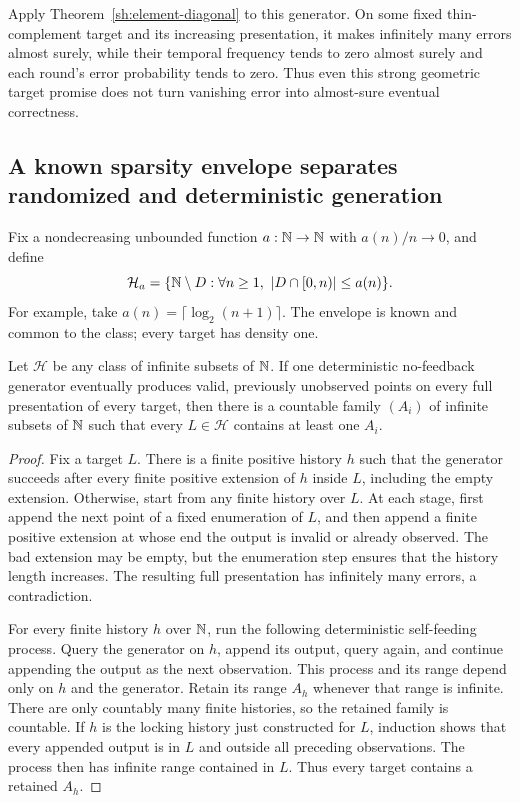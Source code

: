 Apply Theorem~\ref{sh:element-diagonal} to this generator. On some fixed thin-complement target and its increasing presentation, it makes infinitely many errors almost surely, while their temporal frequency tends to zero almost surely and each round's error probability tends to zero. Thus even this strong geometric target promise does not turn vanishing error into almost-sure eventual correctness.

\subsection{A known sparsity envelope separates randomized and deterministic generation}

Fix a nondecreasing unbounded function $a:\mathbb N\to\mathbb N$ with $a(n)/n\to0$, and define
\[
\mathcal H_a=\{\mathbb N\setminus D:\forall n\ge1,\ |D\cap[0,n)|\le a(n)\}.
\]
For example, take $a(n)=\lceil\log_2(n+1)\rceil$. The envelope is known and common to the class; every target has density one.


\begin{lemma}\label{sh:inner}
Let $\mathcal H$ be any class of infinite subsets of $\mathbb N$. If one deterministic no-feedback generator eventually produces valid, previously unobserved points on every full presentation of every target, then there is a countable family $(A_i)$ of infinite subsets of $\mathbb N$ such that every $L\in\mathcal H$ contains at least one $A_i$.
\end{lemma}
\begin{proof}
Fix a target $L$. There is a finite positive history $h$ such that the generator succeeds after every finite positive extension of $h$ inside $L$, including the empty extension. Otherwise, start from any finite history over $L$. At each stage, first append the next point of a fixed enumeration of $L$, and then append a finite positive extension at whose end the output is invalid or already observed. The bad extension may be empty, but the enumeration step ensures that the history length increases. The resulting full presentation has infinitely many errors, a contradiction.

For every finite history $h$ over $\mathbb N$, run the following deterministic self-feeding process. Query the generator on $h$, append its output, query again, and continue appending the output as the next observation. This process and its range depend only on $h$ and the generator. Retain its range $A_h$ whenever that range is infinite. There are only countably many finite histories, so the retained family is countable. If $h$ is the locking history just constructed for $L$, induction shows that every appended output is in $L$ and outside all preceding observations. The process then has infinite range contained in $L$. Thus every target contains a retained $A_h$.
\end{proof}

